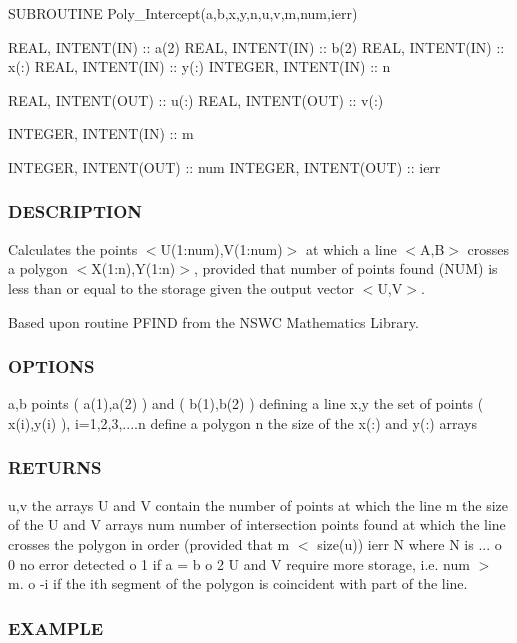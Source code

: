 S\+U\+B\+R\+O\+U\+T\+I\+NE Poly\+\_\+\+Intercept(a,b,x,y,n,u,v,m,num,ierr)

R\+E\+AL, I\+N\+T\+E\+N\+T(\+I\+N) \+:\+: a(2) R\+E\+AL, I\+N\+T\+E\+N\+T(\+I\+N) \+:\+: b(2) R\+E\+AL, I\+N\+T\+E\+N\+T(\+I\+N) \+:\+: x(\+:) R\+E\+AL, I\+N\+T\+E\+N\+T(\+I\+N) \+:\+: y(\+:) I\+N\+T\+E\+G\+ER, I\+N\+T\+E\+N\+T(\+I\+N) \+:\+: n

R\+E\+AL, I\+N\+T\+E\+N\+T(\+O\+U\+T) \+:\+: u(\+:) R\+E\+AL, I\+N\+T\+E\+N\+T(\+O\+U\+T) \+:\+: v(\+:)

I\+N\+T\+E\+G\+ER, I\+N\+T\+E\+N\+T(\+I\+N) \+:\+: m

I\+N\+T\+E\+G\+ER, I\+N\+T\+E\+N\+T(\+O\+U\+T) \+:\+: num I\+N\+T\+E\+G\+ER, I\+N\+T\+E\+N\+T(\+O\+U\+T) \+:\+: ierr

\subsubsection*{D\+E\+S\+C\+R\+I\+P\+T\+I\+ON}

Calculates the points $<$U(1\+:num),V(1\+:num)$>$ at which a line $<$A,B$>$ crosses a polygon $<$X(1\+:n),Y(1\+:n)$>$, provided that number of points found (N\+UM) is less than or equal to the storage given the output vector $<$U,V$>$.

Based upon routine P\+F\+I\+ND from the N\+S\+WC Mathematics Library.

\subsubsection*{O\+P\+T\+I\+O\+NS}

a,b points ( a(1),a(2) ) and ( b(1),b(2) ) defining a line x,y the set of points ( x(i),y(i) ), i=1,2,3,....n define a polygon n the size of the x(\+:) and y(\+:) arrays \subsubsection*{R\+E\+T\+U\+R\+NS}

u,v the arrays U and V contain the number of points at which the line m the size of the U and V arrays num number of intersection points found at which the line crosses the polygon in order (provided that m $<$ size(u)) ierr N where N is ... o 0 no error detected o 1 if a = b o 2 U and V require more storage, i.\+e. num $>$ m. o -\/i if the ith segment of the polygon is coincident with part of the line.

\subsubsection*{E\+X\+A\+M\+P\+LE}

